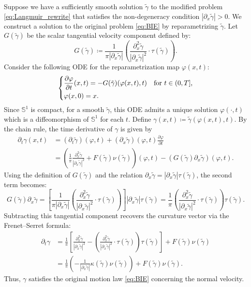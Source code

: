 \documentclass{article}
\theoremstyle{remark}
\theoremstyle{definition}
\numberwithin{equation}{section}
\begin{document}
Suppose we have a sufficiently smooth solution $\tilde{\gamma}$ to the modified problem \eqref{eq:Langmuir_rewrite} that satisfies the non-degeneracy condition $|\partial_x \tilde{\gamma}| > 0$. We construct a solution to the original problem \eqref{eq:BIE} by reparametrizing $\tilde{\gamma}$.
Let $G(\tilde{\gamma})$ be the scalar tangential velocity component defined by:
\[
    G(\tilde{\gamma}) \coloneqq \frac{1}{\pi |\partial_x \tilde{\gamma}|} \left( \frac{\partial_x^2 \tilde{\gamma}}{|\partial_x \tilde{\gamma}|^2} \cdot \tau(\tilde{\gamma}) \right).
\]
Consider the following ODE for the reparametrization map $\varphi(x,t)$:
\begin{equation} \label{eq:change}
    \begin{dcases*}
    \frac{\partial\varphi}{\partial t}(x,t) = -G(\tilde{\gamma})(\varphi(x,t),t) & for $t\in(0,T]$,\\
    \varphi(x,0) = x.
    \end{dcases*}
\end{equation}
Since $\mathbb{S}^1$ is compact, for a smooth $\tilde{\gamma}$, this ODE admits a unique solution $\varphi(\cdot,t)$ which is a diffeomorphism of $\mathbb{S}^1$ for each $t$.
Define $\gamma(x,t) \coloneqq \tilde{\gamma}(\varphi(x,t), t)$.
By the chain rule, the time derivative of $\gamma$ is given by
\begin{align*}
    \partial_t \gamma(x,t) 
    &= (\partial_t \tilde{\gamma})(\varphi, t) + (\partial_x \tilde{\gamma})(\varphi, t) \frac{\partial\varphi}{\partial t} \\
    &= \left( \frac{1}{\pi} \frac{\partial_x^2 \tilde{\gamma}}{|\partial_x \tilde{\gamma}|^2} + F(\tilde{\gamma})\nu(\tilde{\gamma}) \right)(\varphi, t) - \left( G(\tilde{\gamma}) \partial_x \tilde{\gamma} \right)(\varphi, t).
\end{align*}
Using the definition of $G(\tilde{\gamma})$ and the relation $\partial_x \tilde{\gamma} = |\partial_x \tilde{\gamma}| \tau(\tilde{\gamma})$, the second term becomes:
\[
    G(\tilde{\gamma}) \partial_x \tilde{\gamma} 
    = \left[ \frac{1}{\pi |\partial_x \tilde{\gamma}|} \left( \frac{\partial_x^2 \tilde{\gamma}}{|\partial_x \tilde{\gamma}|^2} \cdot \tau(\tilde{\gamma}) \right) \right] |\partial_x \tilde{\gamma}| \tau(\tilde{\gamma})
    = \frac{1}{\pi} \left( \frac{\partial_x^2 \tilde{\gamma}}{|\partial_x \tilde{\gamma}|^2} \cdot \tau(\tilde{\gamma}) \right) \tau(\tilde{\gamma}).
\]
Subtracting this tangential component recovers the curvature vector via the Frenet--Serret formula:
\begin{align*}
    \partial_t \gamma
    &= \frac{1}{\pi} \left[ \frac{\partial_x^2 \tilde{\gamma}}{|\partial_x \tilde{\gamma}|^2} - \left( \frac{\partial_x^2 \tilde{\gamma}}{|\partial_x \tilde{\gamma}|^2} \cdot \tau(\tilde{\gamma}) \right) \tau(\tilde{\gamma}) \right] + F(\tilde{\gamma})\nu(\tilde{\gamma}) \\
    &= \frac{1}{\pi} \left( -\frac{1}{|\partial_x \tilde{\gamma}|} \kappa(\tilde{\gamma})\nu(\tilde{\gamma}) \right) + F(\tilde{\gamma})\nu(\tilde{\gamma}).
\end{align*}
Thus, $\gamma$ satisfies the original motion law \eqref{eq:BIE} concerning the normal velocity.
\end{document}
